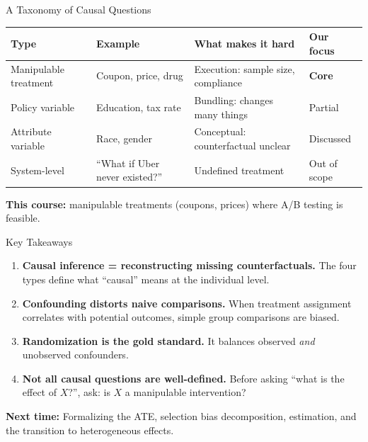 \documentclass[aspectratio=169, 11pt, handout]{beamer}
\begin{document}
\begin{frame}{A Taxonomy of Causal Questions}

\begin{center}
\small
\begin{tabular}{p{2.5cm}p{3cm}p{4.5cm}p{2cm}}
\toprule
\textbf{Type} & \textbf{Example} & \textbf{What makes it hard} & \textbf{Our focus} \\
\midrule
Manipulable treatment & Coupon, price, drug & Execution: sample size, compliance & \textcolor{sbgreen}{\textbf{Core}} \\[0.5em]
Policy variable & Education, tax rate & Bundling: changes many things & Partial \\[0.5em]
Attribute variable & Race, gender & Conceptual: counterfactual unclear & Discussed \\[0.5em]
System-level & ``What if Uber never existed?'' & Undefined treatment & Out of scope \\
\bottomrule
\end{tabular}
\end{center}

\bigskip

\textbf{This course:} manipulable treatments (coupons, prices) where A/B testing is feasible.
\end{frame}

\begin{frame}{Key Takeaways}

\begin{enumerate}
    \item \textbf{Causal inference = reconstructing missing counterfactuals.} The four types define what ``causal'' means at the individual level.
    
    \bigskip
    
    \item \textbf{Confounding distorts naive comparisons.} When treatment assignment correlates with potential outcomes, simple group comparisons are biased.
    
    \bigskip
    
    \item \textbf{Randomization is the gold standard.} It balances observed \emph{and} unobserved confounders.
    
    \bigskip
    
    \item \textbf{Not all causal questions are well-defined.} Before asking ``what is the effect of $X$?'', ask: is $X$ a manipulable intervention?
\end{enumerate}

\bigskip

\textbf{Next time:} Formalizing the ATE, selection bias decomposition, estimation, and the transition to heterogeneous effects.
\end{frame}
\end{document}
